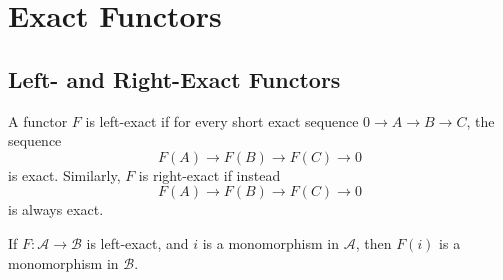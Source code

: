 \section{Exact Functors} %
\label{sec:exact_functors}
\subsection{Left- and Right-Exact Functors} %
\label{sub:left_and_right_exact_functors}
\begin{definition}
   A functor $ F $ is left-exact if for every short exact sequence $ 0 \to A \to B \to C $, the sequence
   \begin{equation*}
   F(A) \to F(B) \to F(C) \to 0
   \end{equation*}
   is exact. Similarly, $ F $ is right-exact if instead
   \begin{equation*}
   F(A)\to F(B) \to F(C) \to 0
   \end{equation*}
   is always exact.
\end{definition}

\begin{lemma}
  If $ F: \mathcal{A} \to \mathcal{B} $ is left-exact, and $ i $ is a monomorphism in $ \mathcal{A} $, then $ F(i) $ is a monomorphism in $ \mathcal{B} $.
\end{lemma}
